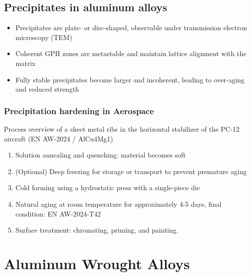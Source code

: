 \documentclass{article}
\begin{document}
\subsection{Precipitates in aluminum alloys}
\begin{itemize}
  \item Precipitates are plate- or disc-shaped, observable under transmission electron microscopy (TEM)
  \item Coherent GPII zones are metastable and maintain lattice alignment with the matrix
  \item Fully stable precipitates become larger and incoherent, leading to over-aging and reduced strength
\end{itemize}

\subsubsection{Precipitation hardening in Aerospace}
Process overview of a sheet metal ribs in the horizontal stabilizer of the PC-12 aircraft (EN AW-2024 / AlCu4Mg1)
\begin{enumerate}
  \item Solution annealing and quenching: material becomes soft
  \item (Optional) Deep freezing for storage or transport to prevent premature aging
  \item Cold forming using a hydrostatic press with a single-piece die
  \item Natural aging at room temperature for approximately 4-5 days, final condition: EN AW-2024-T42
  \item Surface treatment: chromating, priming, and painting.
\end{enumerate}

\newpage
\section{Aluminum Wrought Alloys}


\newpage
\appendix
\printacronyms[name=Glossary, heading=section]
\newpage

\vspace*{-1cm}
\printnomenclature
\end{document}
